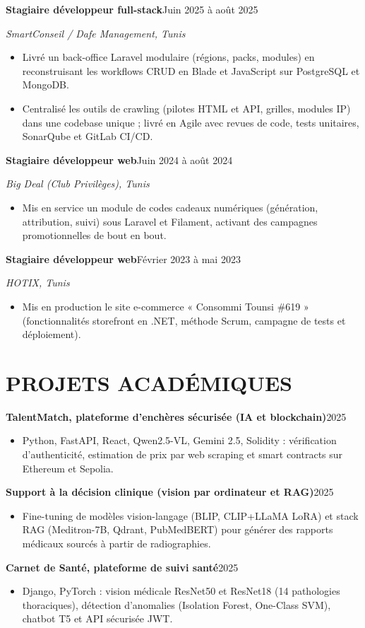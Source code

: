 \documentclass[10pt,a4paper]{article}
\newcommand{\kw}[1]{\mbox{#1}}
\newcommand{\job}[3]{%
 \par\noindent\textbf{\color{primary}#1}\hfill{\color{muted}\small #2}\par\vspace{0.4pt}%
 {\noindent\color{accent}\textit{\small #3}}\par\vspace{1pt}%
 \begin{itemize}[label=\textbullet, leftmargin=0.85em, itemsep=0.8pt, topsep=0.4pt, parsep=0pt, partopsep=0pt]
}
\newcommand{\proj}[2]{%
 \par\noindent\textbf{\color{primary}#1}\hfill{\color{muted}\small #2}\par\vspace{0.4pt}%
 \begin{itemize}[label=\textbullet, leftmargin=0.85em, itemsep=0.8pt, topsep=0.4pt, parsep=0pt, partopsep=0pt]
}
\begin{document}
\job{Stagiaire développeur \kw{full-stack}}{Juin 2025 à août 2025}{SmartConseil / Dafe Management, Tunis}
 \item Livré un \kw{back-office} Laravel modulaire (régions, packs, modules) en reconstruisant les workflows CRUD en Blade et JavaScript sur PostgreSQL et MongoDB.
 \item Centralisé les outils de crawling (pilotes HTML et API, grilles, modules IP) dans une codebase unique ; livré en Agile avec revues de code, tests unitaires, SonarQube et GitLab CI/CD.
\end{itemize}

\job{Stagiaire développeur web}{Juin 2024 à août 2024}{Big Deal (Club Privilèges), Tunis}
 \item Mis en service un module de codes cadeaux numériques (génération, attribution, suivi) sous Laravel et Filament, activant des campagnes promotionnelles de bout en bout.
\end{itemize}

\job{Stagiaire développeur web}{Février 2023 à mai 2023}{HOTIX, Tunis}
 \item Mis en production le site e-commerce « Consommi Tounsi \#619 » (fonctionnalités storefront en .NET, méthode Scrum, campagne de tests et déploiement).
\end{itemize}

\section{PROJETS ACADÉMIQUES}

\proj{TalentMatch, plateforme d'enchères sécurisée (IA et blockchain)}{2025}
 \item Python, FastAPI, React, \kw{Qwen2.5-VL}, Gemini 2.5, Solidity : vérification d'authenticité, estimation de prix par web scraping et smart contracts sur Ethereum et Sepolia.
\end{itemize}

\proj{Support à la décision clinique (vision par ordinateur et RAG)}{2025}
 \item Fine-tuning de modèles \kw{vision-langage} (BLIP, CLIP+LLaMA LoRA) et stack RAG (\kw{Meditron-7B}, Qdrant, PubMedBERT) pour générer des rapports médicaux sourcés à partir de radiographies.
\end{itemize}

\proj{Carnet de Santé, plateforme de suivi santé}{2025}
 \item Django, PyTorch : vision médicale ResNet50 et ResNet18 (14 pathologies thoraciques), détection d'anomalies (Isolation Forest, One-Class SVM), chatbot T5 et API sécurisée JWT.
\end{itemize}
\end{document}
